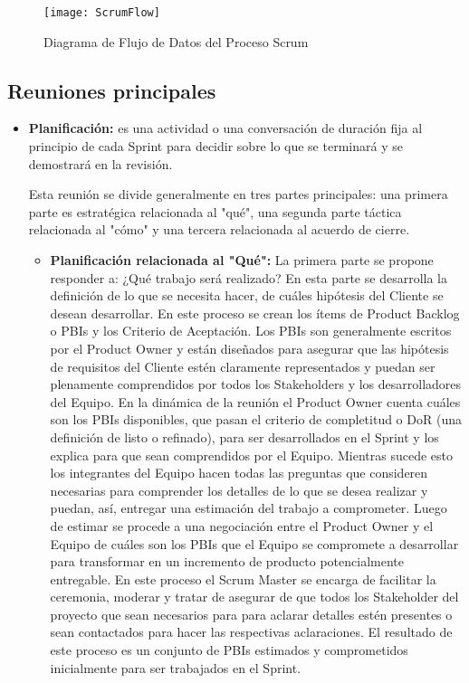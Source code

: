 \begin{figure}[h]
  \centering
  \texttt{[image: ScrumFlow]}
  \caption{Diagrama de Flujo de Datos del Proceso Scrum}
  \centering
  \label{fig:ScrumFlow} %
\end{figure}

\subsection{Reuniones principales}

\begin{itemize}

\item \textbf{Planificación:} es una actividad o una conversación de duración fija al principio de cada Sprint para decidir sobre lo que se terminará y se demostrará en la revisión.

Esta reunión se divide generalmente en tres partes principales: una primera parte es estratégica relacionada al "qué", una segunda parte táctica relacionada al "cómo" y una tercera relacionada al acuerdo de cierre. 

\begin{itemize}

\item \textbf{Planificación relacionada al "Qué":} La primera parte se propone responder a: ¿Qué trabajo será realizado? En esta parte se desarrolla la definición de lo que se necesita hacer, de cuáles hipótesis del Cliente se desean desarrollar. En este proceso se crean los ítems de Product Backlog o PBIs y los Criterio de Aceptación. Los PBIs son generalmente escritos por el Product Owner y están diseñados para asegurar que las hipótesis de requisitos del Cliente estén claramente representados y puedan ser plenamente comprendidos por todos los Stakeholders y los desarrolladores del Equipo.
En la dinámica de la reunión el Product Owner cuenta cuáles son los PBIs disponibles, que pasan el criterio de completitud o DoR (una definición de listo o refinado), para ser desarrollados en el Sprint y los explica para que sean comprendidos por el Equipo. Mientras sucede esto los integrantes del Equipo hacen todas las preguntas que consideren necesarias para comprender los detalles de lo que se desea realizar y puedan, así, entregar una estimación del trabajo a comprometer. Luego de estimar se procede a una negociación entre el Product Owner y el Equipo de cuáles son los PBIs que el Equipo se compromete a desarrollar para transformar en un incremento de producto potencialmente entregable. En este proceso el Scrum Master se encarga de facilitar la ceremonia, moderar y tratar de asegurar de que todos los Stakeholder del proyecto que sean necesarios para para aclarar detalles estén presentes o sean contactados para hacer las respectivas aclaraciones.
El resultado de este proceso es un conjunto de PBIs estimados y comprometidos inicialmente para ser trabajados en el Sprint.


\end{itemize}
\end{itemize}
